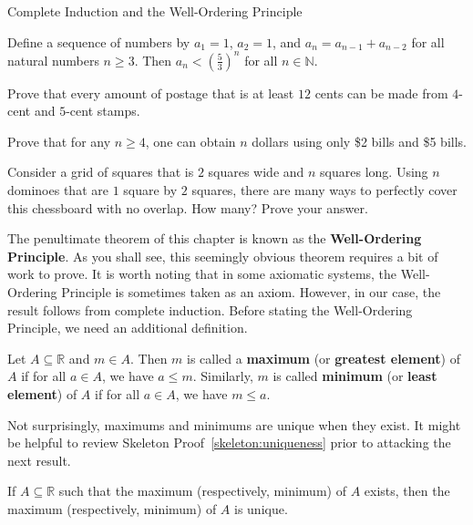 \begin{section}{Complete Induction and the Well-Ordering Principle}
\begin{theorem}
Define a sequence of numbers by $a_1=1$, $a_2=1$, and $a_n=a_{n-1}+a_{n-2}$ for all natural numbers $n \geq 3$.  Then $a_n < \left ( \frac{5}{3} \right )^n$ for all $n \in \mathbb{N}.$
\end{theorem}

\begin{problem}
Prove that every amount of postage that is at least $12$ cents can be made from $4$-cent and $5$-cent stamps.
\end{problem}

\begin{problem}
Prove that for any $n \geq 4$, one can obtain $n$ dollars using only \$2 bills and \$5 bills.
\end{problem}

\begin{problem}
Consider a grid of squares that is $2$ squares wide and $n$ squares long.  Using $n$ dominoes that are $1$ square by $2$ squares, there are many ways to perfectly cover this chessboard with no overlap.  How many?  Prove your answer.
\end{problem}

The penultimate theorem of this chapter is known as the \textbf{Well-Ordering Principle}. As you shall see, this seemingly obvious theorem requires a bit of work to prove. It is worth noting that in some axiomatic systems, the Well-Ordering Principle is sometimes taken as an axiom.  However, in our case, the result follows from complete induction. Before stating the Well-Ordering Principle, we need an additional definition.

\begin{definition}
Let $A\subseteq \mathbb{R}$ and $m\in A$. Then $m$ is called a \textbf{maximum} (or \textbf{greatest element}) of $A$ if for all $a\in A$, we have $a\leq m$. Similarly, $m$ is called \textbf{minimum} (or \textbf{least element}) of $A$ if for all $a\in A$, we have $m\leq a$.
\end{definition}

Not surprisingly, maximums and minimums are unique when they exist. It might be helpful to review Skeleton Proof~\ref{skeleton:uniqueness} prior to attacking the next result.

\begin{theorem}
If $A\subseteq \mathbb{R}$ such that the maximum (respectively, minimum) of $A$ exists, then the maximum (respectively, minimum) of $A$ is unique.
\end{theorem}


\end{section}
